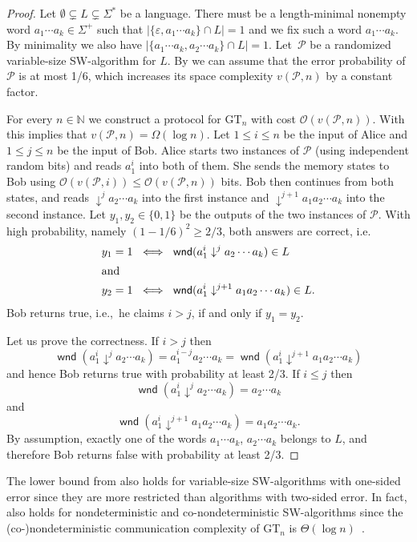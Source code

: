 \documentclass{article}\usepackage[a4paper,margin=20mm]{geometry}
\newcommand{\N}{\mathbb{N}}
\renewcommand{\O}{\mathcal{O}}
\renewcommand{\P}{\mathcal{P}}
\DeclareMathOperator{\wnd}{\mathsf{wnd}}
\newcommand{\eps}{\varepsilon}
\renewcommand{\geq}{\geqslant}
\renewcommand{\leq}{\leqslant}
\renewcommand{\ge}{\geq}
\renewcommand{\le}{\leq}
\begin{document}
\begin{proof}
	Let $\emptyset \subsetneq L \subsetneq \Sigma^*$ be a language.
	There must be a length-minimal nonempty word
	$a_1 \cdots a_k \in \Sigma^+$ such that $|\{\eps,a_1 \cdots a_k\} \cap L| = 1$ and we fix such a word
	$a_1 \cdots a_k$.
	By minimality we also have $|\{a_1 \cdots a_k,a_2 \cdots a_k\} \cap L| = 1$.
	Let~$\P$ be a randomized variable-size SW-algorithm for $L$.
	By  we can assume that the error probability of $\P$ is at most 1/6,
	which increases its space complexity $v(\P,n)$ by a constant factor.
	
	For every $n \in \N$ we construct a protocol for $\mathrm{GT}_n$
	with cost $\O(v(\P,n))$. With  this implies that $v(\P,n) = \Omega(\log n)$.
	Let $1 \le i \le n$ be the input of Alice and $1 \le j \le n$ be the input of Bob.
	Alice starts two instances of $\P$ (using independent random bits)
	and reads $a_1^i$ into both of them.
	She sends the memory states to Bob
	using $\O(v(\P,i)) \le \O(v(\P,n))$ bits.
	Bob then continues from both states, and reads $\downarrow^j a_2 \cdots a_k$ into the first instance
	and $\downarrow^{j+1} a_1 a_2 \cdots a_k$ into the second instance.
	Let $y_1, y_2 \in \{0,1\}$ be the outputs of the two instances of $\P$.
	With high probability, namely $(1-1/6)^2 \ge 2/3$,
	both answers are correct, i.e.
	\begin{align*}
		y_1 = 1 \ & \iff  \ \wnd(a_1^i \downarrow^j a_2 \cdots a_k) \in L \\
	\intertext{and}
		y_2 = 1 \ & \iff \  \wnd(a_1^i \downarrow^{j+1} a_1 a_2 \cdots a_k) \in L.
	\end{align*}
	Bob returns true, i.e.,~he claims $i > j$, if and only if $y_1 = y_2$.
	
	Let us prove the correctness. If $i > j$ then
	\[
		\wnd(a_1^i \downarrow^j a_2 \cdots a_k) = a_1^{i-j} a_2 \cdots a_k = \wnd(a_1^i \downarrow^{j+1} a_1 a_2 \cdots a_k)
	\]
	and hence Bob returns true with probability at least 2/3.
	If $i \le j$ then
	\[
		\wnd(a_1^i \downarrow^j a_2 \cdots a_k) = a_2 \cdots a_k
	\]
	and
	\[
		\wnd(a_1^i \downarrow^{j+1} a_1 a_2 \cdots a_k) = a_1a_2 \cdots a_k.
	\]
	By assumption, exactly one of the words $a_1 \cdots a_k$, $a_2 \cdots a_k$ belongs to $L$,
	and therefore Bob returns false with probability at least 2/3.
\end{proof}

The lower bound from  also holds for variable-size SW-algorithms with one-sided error
since they are more restricted than algorithms with two-sided error.
In fact,  also holds for nondeterministic and co-nondeterministic SW-algorithms
since the (co-)nondeterministic communication complexity of $\mathrm{GT}_n$ is $\Theta(\log n)$~\cite[Chapter~5]{Roughgarden16}.
\end{document}
